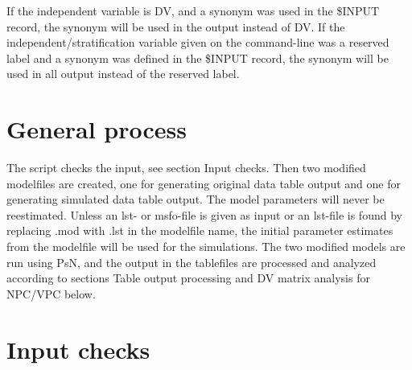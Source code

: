 If the independent variable is DV, and a synonym was used in the \$INPUT record, the synonym will be used in the output instead of DV.  If  the independent/stratification variable given on the command-line was a reserved label and a synonym was defined in the \$INPUT record, the synonym will be used in all output instead of the reserved label.

\section{General process}
The script checks the input, see section Input checks. Then two modified modelfiles are created, one for generating original data table output and one for generating simulated data table output. The model parameters will never be reestimated. Unless an lst- or msfo-file is given as input or an lst-file is found by replacing .mod with .lst in the modelfile name, the initial parameter estimates from the modelfile will be used for the simulations. The two modified models are run using PsN, and the output in the tablefiles are processed and analyzed according to sections Table output processing and DV matrix analysis for NPC/VPC below. 

\section{Input checks}


